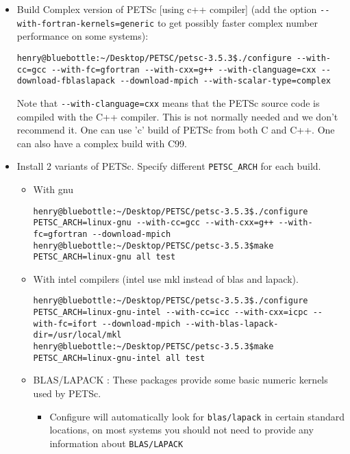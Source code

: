 \documentclass{article}
\begin{document}
\begin{itemize}
\item Build Complex version of PETSc [using c++ compiler] (add the option \verb+--with-fortran-kernels=generic+ to get possibly faster complex number performance on some systems):
\begin{tiny}\begin{verbatim}
henry@bluebottle:~/Desktop/PETSC/petsc-3.5.3$./configure --with-cc=gcc --with-fc=gfortran --with-cxx=g++ --with-clanguage=cxx --download-fblaslapack --download-mpich --with-scalar-type=complex
\end{verbatim}\end{tiny}
Note that \verb+--with-clanguage=cxx+ means that the PETSc source code is compiled with the C++ compiler. This is not normally needed and we don't recommend it.
One can use 'c' build of PETSc from both C and C++. One can also have a complex build with C99.
\item Install 2 variants of PETSc. Specify different \verb+PETSC_ARCH+ for each build.
\begin{itemize}
\item With gnu
\begin{tiny}\begin{verbatim}
henry@bluebottle:~/Desktop/PETSC/petsc-3.5.3$./configure PETSC_ARCH=linux-gnu --with-cc=gcc --with-cxx=g++ --with-fc=gfortran --download-mpich
henry@bluebottle:~/Desktop/PETSC/petsc-3.5.3$make PETSC_ARCH=linux-gnu all test
\end{verbatim}\end{tiny}  
\item With intel compilers (intel use mkl instead of blas and lapack).
\begin{tiny}\begin{verbatim}
henry@bluebottle:~/Desktop/PETSC/petsc-3.5.3$./configure PETSC_ARCH=linux-gnu-intel --with-cc=icc --with-cxx=icpc --with-fc=ifort --download-mpich --with-blas-lapack-dir=/usr/local/mkl
henry@bluebottle:~/Desktop/PETSC/petsc-3.5.3$make PETSC_ARCH=linux-gnu-intel all test
\end{verbatim}\end{tiny}
\item BLAS/LAPACK : These packages provide some basic numeric kernels used by PETSc.
\begin{itemize}
\item Configure will automatically look for \verb+blas/lapack+ in certain standard locations, on most systems you should not need to provide any information about \verb+BLAS/LAPACK+ 

\end{itemize}
\end{itemize}
\end{itemize}
\end{document}
